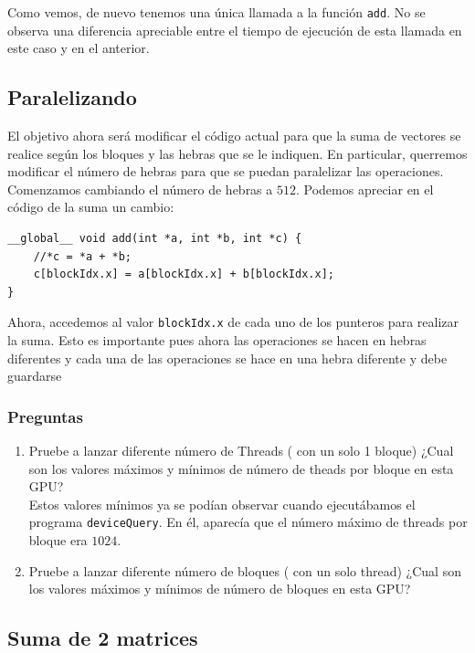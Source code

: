 \documentclass[11pt]{article}
\def\inline{\lstinline[basicstyle=\ttfamily,keywordstyle={}]}
\begin{document}
Como vemos, de nuevo tenemos una única llamada a la función \inline{add}. No se observa una diferencia apreciable entre el tiempo de ejecución de esta llamada en este caso y en el anterior.


\subsection{Paralelizando}


El objetivo ahora será modificar el código actual para que la suma de vectores se realice según los bloques y las hebras que se le indiquen. En particular, querremos modificar el número de hebras para que se puedan paralelizar las operaciones. Comenzamos cambiando el número de hebras a $512$. Podemos apreciar en el código de la suma un cambio:

\begin{verbatim}
__global__ void add(int *a, int *b, int *c) {
    //*c = *a + *b;
    c[blockIdx.x] = a[blockIdx.x] + b[blockIdx.x];
}
\end{verbatim}

Ahora, accedemos al valor \inline{blockIdx.x} de cada uno de los punteros para realizar la suma. Esto es importante pues ahora las operaciones se hacen en hebras diferentes y cada una de las operaciones se hace en una hebra diferente y debe guardarse


\subsubsection{Preguntas}


\begin{enumerate}

\item Pruebe a lanzar diferente número de Threads ( con un solo 1 bloque)
  ¿Cual son los valores máximos y mínimos de número de theads por bloque en esta GPU?\\

  Estos valores mínimos ya se podían observar cuando ejecutábamos el programa \inline{deviceQuery}. En él, aparecía que el número máximo de threads por bloque era $1024$.

\item Pruebe a lanzar diferente número de bloques ( con un solo thread) ¿Cual son los valores máximos y mínimos de número de bloques en esta GPU?
\end{enumerate}

\subsection{Suma de 2 matrices}
\end{document}
